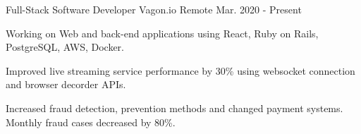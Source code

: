 
\begin{cventries}
  \cvopenentry
   {Full-Stack Software Developer
   } %
    {Vagon.io} %
    {Remote} %
    {Mar. 2020 - Present} %
    {
      \begin{cvitems} %
        \item {Working on Web and back-end applications using React, Ruby on Rails, PostgreSQL, AWS, Docker.}
		\item {Improved live streaming service performance by 30\% using websocket connection and browser decorder APIs.}
		\item {Increased fraud detection, prevention methods and changed payment systems. Monthly fraud cases decreased by 80\%.}
      \end{cvitems}
    }


\end{cventries}
